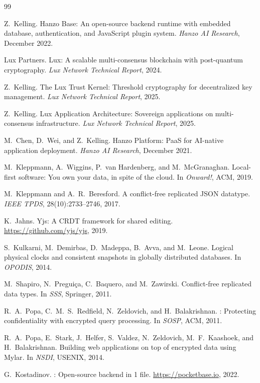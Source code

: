 \documentclass[11pt]{article}
\begin{document}
\begin{thebibliography}{99}

Z.~Kelling.
\newblock Hanzo Base: An open-source backend runtime with embedded database,
authentication, and {JavaScript} plugin system.
\newblock \emph{Hanzo AI Research}, December 2022.

{Lux Partners}.
\newblock Lux: A scalable multi-consensus blockchain with post-quantum
cryptography.
\newblock \emph{Lux Network Technical Report}, 2024.

Z.~Kelling.
\newblock The Lux Trust Kernel: Threshold cryptography for decentralized key
management.
\newblock \emph{Lux Network Technical Report}, 2025.

Z.~Kelling.
\newblock Lux Application Architecture: Sovereign applications on
multi-consensus infrastructure.
\newblock \emph{Lux Network Technical Report}, 2025.

M.~Chen, D.~Wei, and Z.~Kelling.
\newblock Hanzo Platform: {PaaS} for {AI}-native application deployment.
\newblock \emph{Hanzo AI Research}, December 2021.

M.~Kleppmann, A.~Wiggins, P.~van Hardenberg, and M.~McGranaghan.
\newblock Local-first software: You own your data, in spite of the cloud.
\newblock In \emph{Onward!}, ACM, 2019.

M.~Kleppmann and A.~R.~Beresford.
\newblock A conflict-free replicated {JSON} datatype.
\newblock \emph{IEEE TPDS}, 28(10):2733--2746, 2017.

K.~Jahns.
\newblock Yjs: A {CRDT} framework for shared editing.
\newblock \url{https://github.com/yjs/yjs}, 2019.

S.~Kulkarni, M.~Demirbas, D.~Madeppa, B.~Avva, and M.~Leone.
\newblock Logical physical clocks and consistent snapshots in globally
distributed databases.
\newblock In \emph{OPODIS}, 2014.

M.~Shapiro, N.~Pregui\c{c}a, C.~Baquero, and M.~Zawirski.
\newblock Conflict-free replicated data types.
\newblock In \emph{SSS}, Springer, 2011.

R.~A.~Popa, C.~M.~S.~Redfield, N.~Zeldovich, and H.~Balakrishnan.
: Protecting confidentiality with encrypted query processing.
\newblock In \emph{SOSP}, ACM, 2011.

R.~A.~Popa, E.~Stark, J.~Helfer, S.~Valdez, N.~Zeldovich,
M.~F.~Kaashoek, and H.~Balakrishnan.
\newblock Building web applications on top of encrypted data using {Mylar}.
\newblock In \emph{NSDI}, USENIX, 2014.

G.~Kostadinov.
: Open-source backend in 1 file.
\newblock \url{https://pocketbase.io}, 2022.

\end{thebibliography}
\end{document}
